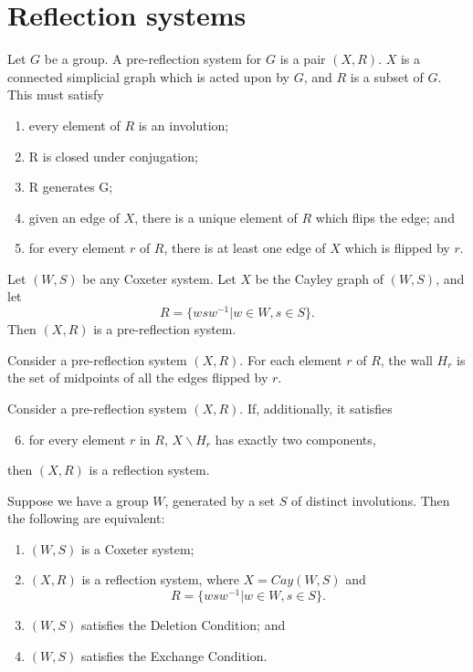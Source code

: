 \documentclass[11pt]{article}
\begin{document}
\section{Reflection systems}
\begin{definition}
    Let $G$ be a group. A pre-reflection system for $G$ is a pair $(X,R)$. $X$ is a connected simplicial graph which is acted upon by $G$, and $R$ is a subset of $G$. This must satisfy
    \begin{enumerate}
        \item every element of $R$ is an involution;
        \item R is closed under conjugation;
        \item R generates G;
        \item given an edge of $X$, there is a unique element of $R$ which flips the edge; and
        \item for every element $r$ of $R$, there is at least one edge of $X$ which is flipped by $r$. 
    \end{enumerate}
\end{definition}

\begin{example}
    Let $(W,S)$ be any Coxeter system. Let $X$ be the Cayley graph of $(W,S)$, and let
    \[ R=\{wsw^{-1}|w\in W, s\in S\}. \]
    Then $(X,R)$ is a pre-reflection system.
\end{example}

\begin{definition}
    Consider a pre-reflection system $(X,R)$. For each element $r$ of $R$, the wall $H_r$ is the set of midpoints of all the edges flipped by $r$. 
\end{definition}

\begin{definition}
    Consider a pre-reflection system $(X,R)$. If, additionally, it satisfies
    \begin{enumerate}
        \setcounter{enumi}{5}
        \item for every element $r$ in $R$, $X\backslash H_r$ has exactly two components,
    \end{enumerate}
    then $(X,R)$ is a reflection system. 
\end{definition}


\begin{theorem}
    Suppose we have a group $W$, generated by a set $S$ of distinct involutions. Then the following are equivalent:
    \begin{enumerate}
        \item $(W,S)$ is a Coxeter system;
        \item $(X,R)$ is a reflection system, where $X=Cay(W,S)$ and \[R=\{wsw^{-1}|w\in W, s\in S\}.\]
        \item $(W,S)$ satisfies the Deletion Condition; and
        \item $(W,S)$ satisfies the Exchange Condition.
    \end{enumerate}
\end{theorem}
\end{document}
